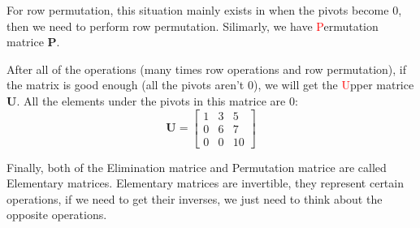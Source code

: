         For  row permutation, this situation mainly exists in when the pivots become 0, 
        then we need to perform row permutation. Silimarly, we have \textcolor{red}{P}ermutation matrice \textbf{P}.
        
        After all of the operations (many times row operations and row permutation), if the matrix is good enough (all the pivots aren't 0),
        we will get the \textcolor{red}{U}pper matrice \textbf{U}. All the elements under the pivots in this matrice are 0:
            \begin{equation}
                \mathbf{U} = 
                \begin{bmatrix}
                    \boxed{1} & 3 & 5\\
                    0 & \boxed{6} & 7\\
                    0 & 0 & \boxed{10}
                \end{bmatrix}
            \end{equation}
        
        Finally, both of the Elimination matrice and Permutation matrice are called Elementary matrices.
        Elementary matrices are invertible, they represent certain operations, if we need to get their inverses,
        we just need to think about the opposite operations.

